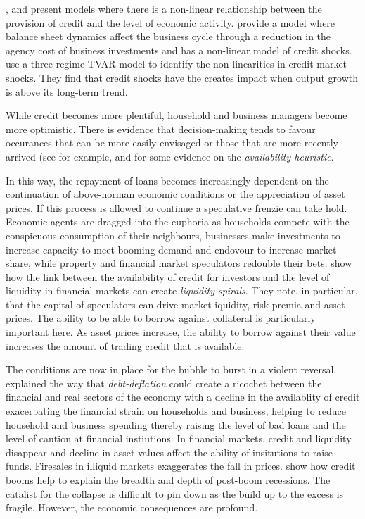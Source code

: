 \documentclass[12pt, a4paper, oneside]{article} %
\begin{document}
\citet{Bernanke1999chapter}, \citet{BernankeGertler} and \citet{Azaraidis} present models where there is a non-linear relationship between  the provision of credit and the level of economic activity. \citet{BernankeGertlerAgency} provide a model where balance sheet dynamics affect the business cycle through a reduction in the agency cost of business investments and \citet{Balke} has a non-linear model of credit shocks.  \citet{Avdjiev2014} use a three regime TVAR model to identify the non-linearities in credit market shocks.  They find that credit shocks have the creates impact when output growth is above its long-term trend. 

While credit becomes more plentiful, household and business managers become more optimistic.  There is evidence that decision-making tends to favour occurances that can be more easily envisaged or those that are more recently arrived (see for example, \citet{KTAvailability} and \citet{Schwartzavailability} for some evidence on the \emph{availability heuristic}.   %

In this way, the repayment of loans becomes increasingly dependent on the continuation of above-norman economic conditions or the appreciation of asset prices.  If this process is allowed to continue a speculative frenzie can take hold.  Economic agents are dragged into the euphoria as households compete with the conspicuous consumption of their neighbours, businesses make investments to increase capacity to meet booming demand and endovour to increase market share, while property and financial market speculators redouble their bets.  \citet{BrunnermeierLiquidity} show how the link between the availability of credit for investors and the level of liquidity in financial markets can create \emph{liquidity spirals}.   They note, in particular, that the capital of speculators can drive market iquidity, risk premia and asset prices.  The ability to be able to borrow against collateral is particularly important here.  As asset prices increase, the ability to borrow against their value increases the amount of trading credit that is available.  

The conditions are now in place for the bubble to burst in a violent reversal.  \citet{FisherBD, FisherDD} explained the way that \emph{debt-deflation} could create a ricochet between the financial and real sectors of the economy with a decline in the availablity of credit exacerbating the financial strain on households and business, helping to reduce household and business spending thereby raising the level of bad loans and the level of caution at financial instiutions. In financial markets, credit and liquidity disappear and decline in asset values affect the ability of insitutions to raise funds.  Firesales in illiquid markets exaggerates the fall in prices. \citet{ReinhartRogoff} show how credit booms help to explain the breadth and depth of post-boom recessions.  The catalist for the collapse is difficult to pin down as the build up to the excess is fragile.  However, the economic consequences are profound.  
\end{document}
